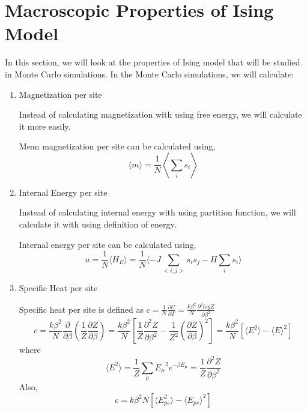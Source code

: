 \documentclass[12pt,fleqn]{report}
\begin{document}
\section{Macroscopic Properties of Ising Model}

In this section, we will look at the properties of Ising model that will be studied in Monte Carlo simulations. In the Monte Carlo simulations, we will calculate:
\begin{enumerate}[start=1]

\item Magnetization per site

Instead of calculating magnetization with using free energy, we will calculate it more easily. 

Mean magnetization per site can be calculated using, 
\begin{equation}
\langle m \rangle = \frac{1}{N} \left\langle \sum\limits_{i} s_i \right\rangle
\end{equation}

\item Internal Energy per site

Instead of calculating internal energy with using partition function, we will calculate it with using definition of energy.

Internal energy per site can be calculated using, 
\begin{equation}
u = \frac{1}{N} \langle H_E \rangle = \frac{1}{N} \langle - J \sum\limits_{<i,j>} s_i s_j - H \sum\limits_{i} s_i \rangle
\end{equation}

\item Specific Heat per site 

Specific heat per site is defined as $c = \frac{1}{N} \frac{\partial U}{\partial T} =\frac{k \beta^2}{N} \frac{\partial^2 logZ}{\partial \beta^2}$
\begin{equation}
c = \frac{k \beta^2}{N} \frac{\partial}{\partial \beta} \left(  \frac{1}{Z} \frac{\partial Z}{\partial \beta}     \right) = \frac{k \beta^2}{N} \left[ \frac{1}{Z} \frac{\partial^2 Z}{\partial \beta^2} - \frac{1}{Z^2} \left( \frac{\partial Z}{\partial \beta}\right)^2 \right] = \frac{k \beta^2}{N} [ \langle E^2 \rangle - \langle E \rangle^2 ]
\end{equation}
where
\begin{equation}
\langle E^2 \rangle = \frac{1}{Z}\sum\limits_{\mu} {E_\mu}^2 e^{-\beta  E_\mu} = \frac{1}{Z} \frac{\partial^2 Z}{\partial \beta^2}   
\end{equation}
Also,
\begin{equation}
c = k \beta^2 N [ \langle E_{ps}^2 \rangle - \langle E_{ps} \rangle^2 ]
\end{equation}


\end{enumerate}
\end{document}
